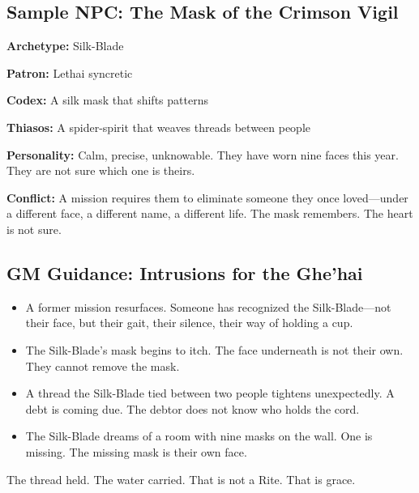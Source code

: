 \subsection{Sample NPC: The Mask of the Crimson Vigil}

\textbf{Archetype:} Silk-Blade

\textbf{Patron:} Lethai syncretic

\textbf{Codex:} A silk mask that shifts patterns

\textbf{Thiasos:} A spider-spirit that weaves threads between people

\textbf{Personality:} Calm, precise, unknowable. They have worn nine faces this year. They are not sure which one is theirs.

\textbf{Conflict:} A mission requires them to eliminate someone they once loved—under a different face, a different name, a different life. The mask remembers. The heart is not sure.

\subsection{GM Guidance: Intrusions for the Ghe'hai}

\begin{itemize}
\item A former mission resurfaces. Someone has recognized the Silk-Blade—not their face, but their gait, their silence, their way of holding a cup.
\item The Silk-Blade's mask begins to itch. The face underneath is not their own. They cannot remove the mask.
\item A thread the Silk-Blade tied between two people tightens unexpectedly. A debt is coming due. The debtor does not know who holds the cord.
\item The Silk-Blade dreams of a room with nine masks on the wall. One is missing. The missing mask is their own face.
\end{itemize}

The thread held. The water carried. That is not a Rite. That is grace.
